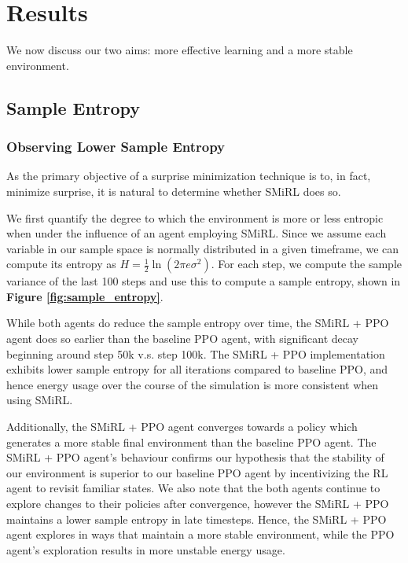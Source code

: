 \section{Results}\label{sec:results}
We now discuss our two aims: more effective learning and a more stable environment.

\subsection{Sample Entropy}
\subsubsection{Observing Lower Sample Entropy}
As the primary objective of a surprise minimization technique is to, in fact,  minimize surprise, it is natural to determine whether SMiRL does so.

We first quantify the degree to which the environment is more or less entropic when under the influence of an agent employing SMiRL. Since we assume each variable in our sample space is normally distributed in a given timeframe, we can compute its entropy as $ H = \frac{1}{2} \ln (2 \pi e \sigma^2)$. For each step, we compute the sample variance of the last 100 steps and use this to compute a sample entropy, shown in \textbf{Figure \ref{fig:sample_entropy}}. 

While both agents do reduce the sample entropy over time, the SMiRL + PPO agent does so earlier than the baseline PPO agent, with significant decay beginning around step 50k v.s. step 100k. 
The SMiRL + PPO implementation exhibits lower sample entropy for all iterations compared to baseline PPO, and hence energy usage over the course of the simulation is more consistent when using SMiRL.

Additionally, the SMiRL + PPO agent converges towards a policy which generates a more stable final environment than the baseline PPO agent. %
The SMiRL + PPO agent's behaviour confirms our hypothesis that the stability of our environment is superior to our baseline PPO agent by incentivizing the RL agent to revisit familiar states. 
We also note that the both agents continue to explore changes to their policies after convergence, however the SMiRL + PPO maintains a lower sample entropy in late timesteps. Hence, the SMiRL + PPO agent explores in ways that maintain a more stable environment, while the PPO agent's exploration results in more unstable energy usage.

